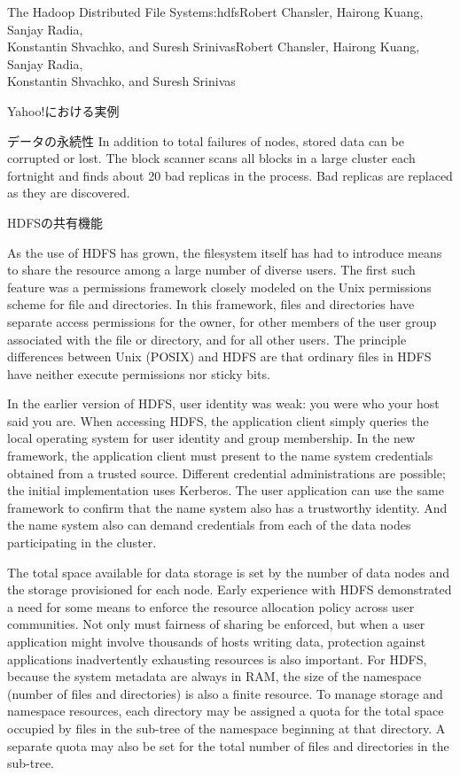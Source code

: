 \begin{aosachaptertoc}{The Hadoop Distributed File System}{s:hdfs}{Robert Chansler, Hairong Kuang, Sanjay Radia, \\ Konstantin Shvachko, and Suresh Srinivas}{Robert Chansler, Hairong Kuang, Sanjay Radia, \\ \hspace*{0.9cm} Konstantin Shvachko, and Suresh Srinivas}
\begin{aosasect1}{Yahoo!における実例}
\begin{aosasect2}{データの永続性}
In addition to total failures of nodes, stored data can be corrupted
or lost. The block scanner scans all blocks in a large cluster each
fortnight and finds about 20 bad replicas in the process. Bad replicas
are replaced as they are discovered.

\end{aosasect2}

\begin{aosasect2}{HDFSの共有機能}

As the use of HDFS has grown, the filesystem itself has had to
introduce means to share the resource among a large number of diverse users. 
The first such feature was a permissions framework closely
modeled on the Unix permissions scheme for file and directories. In
this framework, files and directories have separate access permissions
for the owner, for other members of the user group associated with the
file or directory, and for all other users. The principle differences
between Unix (POSIX) and HDFS are that ordinary files in HDFS have
neither execute permissions nor sticky bits.

In the earlier version of HDFS, user identity was weak: you were who
your host said you are. When accessing HDFS, the application client
simply queries the local operating system for user identity and group
membership. In the new framework, the application client must present
to the name system credentials obtained from a trusted
source. Different credential administrations are possible; the initial
implementation uses Kerberos.  The user application can use the same
framework to confirm that the name system also has a trustworthy
identity. And the name system also can demand credentials from each of
the data nodes participating in the cluster.

The total space available for data storage is set by the number of
data nodes and the storage provisioned for each node. Early experience
with HDFS demonstrated a need for some means to enforce the resource
allocation policy across user communities. Not only must fairness of
sharing be enforced, but when a user application might involve
thousands of hosts writing data, protection against applications
inadvertently exhausting resources is also important. For HDFS,
because the system metadata are always in RAM, the size of the
namespace (number of files and directories) is also a finite
resource. To manage storage and namespace resources, each directory
may be assigned a quota for the total space occupied by files in the
sub-tree of the namespace beginning at that directory. A separate
quota may also be set for the total number of files and directories in
the sub-tree.


\end{aosasect2}
\end{aosasect1}
\end{aosachaptertoc}
